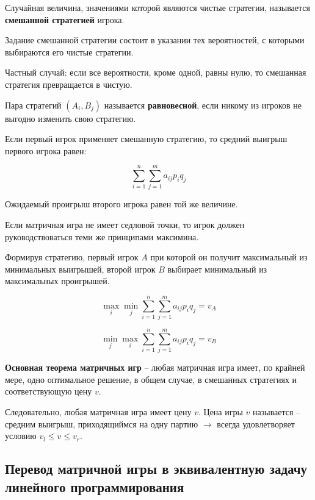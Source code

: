 \documentclass[9pt, a4paper]{article}
\begin{document}
    Случайная величина, значениями которой являются чистые стратегии, называется
    \textbf{смешанной стратегией} игрока.

    Задание смешанной стратегии состоит в указании тех вероятностей, с которыми
    выбираются его чистые стратегии.

    Частный случай: если все вероятности, кроме одной, равны нулю, то смешанная стратегия
    превращается в чистую.

    Пара стратегий $(A_i, B_j)$ называется \textbf{равновесной}, если никому из игроков
    не выгодно изменить свою стратегию.

    Если первый игрок применяет смешанную стратегию, то средний выигрыш первого игрока
    равен:

    \begin{equation}
        \sum_{i=1}^n \sum_{j=1}^m a_{ij} p_i q_j\label{eq:equation}
    \end{equation}

    Ожидаемый проигрыш второго игрока равен той же величине.

    Если матричная игра не имеет седловой точки, то игрок должен руководствоваться теми
    же принципами максимина.

    Формируя стратегию, первый игрок $A$ при которой он получит максимальный из минимальных выигрышей,
    второй игрок $B$ выбирает минимальный из максимальных проигрышей.

    \begin{equation}
        \max_{i} \min_{j} \sum_{i=1}^n \sum_{j=1}^m a_{ij} p_i q_j = v_A\label{eq:equation2}
    \end{equation}

    \begin{equation}
        \min_{j} \max_{i} \sum_{i=1}^n \sum_{j=1}^m a_{ij} p_i q_j = v_B\label{eq:equation3}
    \end{equation}

    \textbf{Основная теорема матричных игр} -- любая матричная игра имеет, по крайней мере,
    одно оптимальное решение, в общем случае, в смешанных стратегиях и соответствующую
    цену $v$.


    Следовательно, любая матричная игра имеет цену $v$.
    Цена игры $v$ называется -- средним выигрыш, приходящиймся на одну партию $\rightarrow$
    всегда удовлетворяет условию $v_l \le v \le v_r$.

    \subsection{Перевод матричной игры в эквивалентную задачу линейного программирования}\label{subsec:to_linear_programming}
\end{document}
